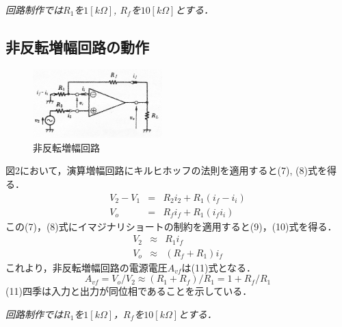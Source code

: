 \documentclass[10pt, a4j, dvipdfmx]{jarticle}
\begin{document}
\emph{回路制作では$R_1$を$1[k\Omega]$, $R_f$を$10[k\Omega]$とする．}


\subsection{非反転増幅回路の動作}
\begin{figure}
    \vspace*{-\intextsep}
    \begin{center}
     \includegraphics[width=50mm]{text/fig-2.jpg}
     \caption{非反転増幅回路}
    \end{center}
\end{figure}
図2において，演算増幅回路にキルヒホッフの法則を適用すると(7), (8)式を得る．
\begin{eqnarray}
    V_2 - V_1 & = & R_2 i_2 + R_1 (i_f - i_i) \\
    V_o & = & R_f i_f + R_1 (i_f i_i)
\end{eqnarray}
この(7)，(8)式にイマジナリショートの制約を適用すると(9)，(10)式を得る．
\begin{eqnarray}
    V_2 & \approx & R_1 i_f \\
    V_o & \approx & (R_f + R_1) i_f
\end{eqnarray}
これより，非反転増幅回路の電源電圧$A_{vf}$は(11)式となる．
\begin{equation}
    A_{vf} = V_o / V_2 \approx (R_1 + R_f) / R_1 = 1 + R_f / R_1
\end{equation}
(11)四季は入力と出力が同位相であることを示している．

\emph{回路制作では$R_1$を$1[k\Omega]$，$R_f$を$10[k\Omega]$とする．}
\end{document}
